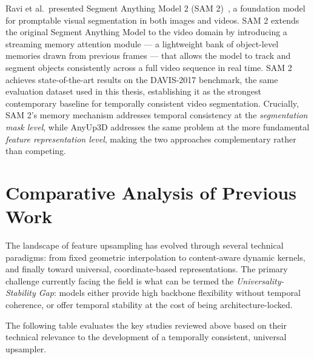 Ravi et al.\ presented Segment Anything Model 2
(SAM 2)~\cite{sam2}, a foundation model for promptable visual
segmentation in both images and videos.
SAM 2 extends the original Segment Anything Model to the
video domain by introducing a streaming memory attention
module --- a lightweight bank of object-level memories drawn
from previous frames --- that allows the model to track and
segment objects consistently across a full video sequence
in real time.
SAM 2 achieves state-of-the-art results on the DAVIS-2017
benchmark, the same evaluation dataset used in this thesis,
establishing it as the strongest contemporary baseline for
temporally consistent video segmentation.
Crucially, SAM 2's memory mechanism addresses temporal
consistency at the \emph{segmentation mask level}, while
AnyUp3D addresses the same problem at the more
fundamental \emph{feature representation level}, making the
two approaches complementary rather than competing.


\section{Comparative Analysis of Previous Work}

The landscape of feature upsampling has evolved through
several technical paradigms: from fixed geometric
interpolation to content-aware dynamic kernels, and finally
toward universal, coordinate-based representations.
The primary challenge currently facing the field is what can
be termed the \textit{Universality-Stability Gap}: models
either provide high backbone flexibility without temporal
coherence, or offer temporal stability at the cost of being
architecture-locked.

The following table evaluates the key studies reviewed above
based on their technical relevance to the development of a
temporally consistent, universal upsampler.

